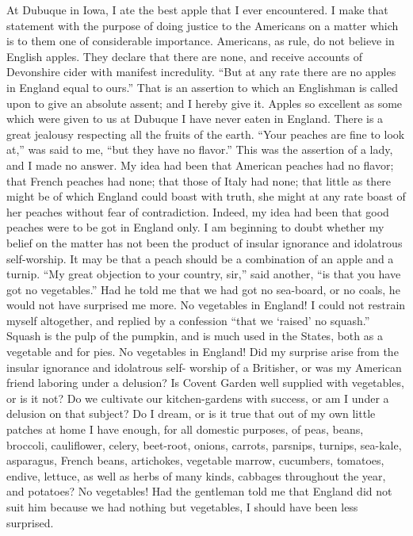 At Dubuque in Iowa, I ate the best apple that I ever encountered.
I make that statement with the purpose of doing justice to the
Americans on a matter which is to them one of considerable
importance.  Americans, as rule, do not believe in English apples.
They declare that there are none, and receive accounts of
Devonshire cider with manifest incredulity.  ``But at any rate there
are no apples in England equal to ours.''  That is an assertion to
which an Englishman is called upon to give an absolute assent; and
I hereby give it.  Apples so excellent as some which were given to
us at Dubuque I have never eaten in England.  There is a great
jealousy respecting all the fruits of the earth.  ``Your peaches are
fine to look at,'' was said to me, ``but they have no flavor.''  This
was the assertion of a lady, and I made no answer.  My idea had
been that American peaches had no flavor; that French peaches had
none; that those of Italy had none; that little as there might be
of which England could boast with truth, she might at any rate
boast of her peaches without fear of contradiction.  Indeed, my
idea had been that good peaches were to be got in England only.  I
am beginning to doubt whether my belief on the matter has not been
the product of insular ignorance and idolatrous self-worship.  It
may be that a peach should be a combination of an apple and a
turnip.  ``My great objection to your country, sir,'' said another,
``is that you have got no vegetables.''  Had he told me that we had
got no sea-board, or no coals, he would not have surprised me more.
No vegetables in England!  I could not restrain myself altogether,
and replied by a confession ``that we `raised' no squash.''  Squash
is the pulp of the pumpkin, and is much used in the States, both as
a vegetable and for pies.  No vegetables in England!  Did my
surprise arise from the insular ignorance and idolatrous self-
worship of a Britisher, or was my American friend laboring under a
delusion?  Is Covent Garden well supplied with vegetables, or is it
not?  Do we cultivate our kitchen-gardens with success, or am I
under a delusion on that subject?  Do I dream, or is it true that
out of my own little patches at home I have enough, for all
domestic purposes, of peas, beans, broccoli, cauliflower, celery,
beet-root, onions, carrots, parsnips, turnips, sea-kale, asparagus,
French beans, artichokes, vegetable marrow, cucumbers, tomatoes,
endive, lettuce, as well as herbs of many kinds, cabbages
throughout the year, and potatoes?  No vegetables!  Had the
gentleman told me that England did not suit him because we had
nothing but vegetables, I should have been less surprised.

